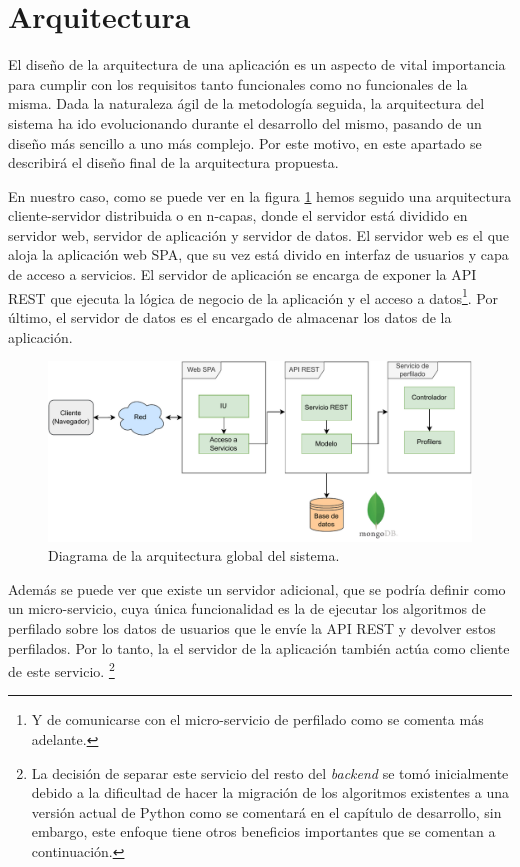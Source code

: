 \section{Arquitectura}
\label{sec:arquitectura}
El diseño de la arquitectura de una aplicación es un aspecto de vital importancia para cumplir con los requisitos tanto funcionales como no funcionales de la misma. Dada la naturaleza ágil de la metodología seguida, la arquitectura del sistema ha ido evolucionando durante el desarrollo del mismo, pasando de un diseño más sencillo a uno más complejo. Por este motivo, en este apartado se describirá el diseño final de la arquitectura propuesta.

En nuestro caso, como se puede ver en la figura \ref{fig:diagrama/arquitectura} hemos seguido una arquitectura cliente-servidor distribuida o en n-capas, donde el servidor está dividido en servidor web, servidor de aplicación y servidor de datos. El servidor web es el que aloja la aplicación web SPA, que su vez está divido en interfaz de usuarios y capa de acceso a servicios. El servidor de aplicación se encarga de exponer la API REST que ejecuta la lógica de negocio de la aplicación y el acceso a datos\footnote{Y de comunicarse con el micro-servicio de perfilado como se comenta más adelante.}. Por último, el servidor de datos es el encargado de almacenar los datos de la aplicación. 

\begin{figure}[H]
  \centering
  \includegraphics[width=\textwidth]{imaxes/diagramas/arquitectura.pdf}
  \caption{Diagrama de la arquitectura global del sistema.}  \label{fig:diagrama/arquitectura}
\end{figure}

Además se puede ver que existe un servidor adicional, que se podría definir como un micro-servicio, cuya única funcionalidad es la de ejecutar los algoritmos de perfilado sobre los datos de usuarios que le envíe la API REST y devolver estos perfilados. Por lo tanto, la el servidor de la aplicación también actúa como cliente de este servicio. \footnote{La decisión de separar este servicio del resto del \textit{backend} se tomó inicialmente debido a la dificultad de hacer la migración de los algoritmos existentes a una versión actual de Python como se comentará en el capítulo de desarrollo, sin embargo, este enfoque tiene otros beneficios importantes que se comentan a continuación.}

